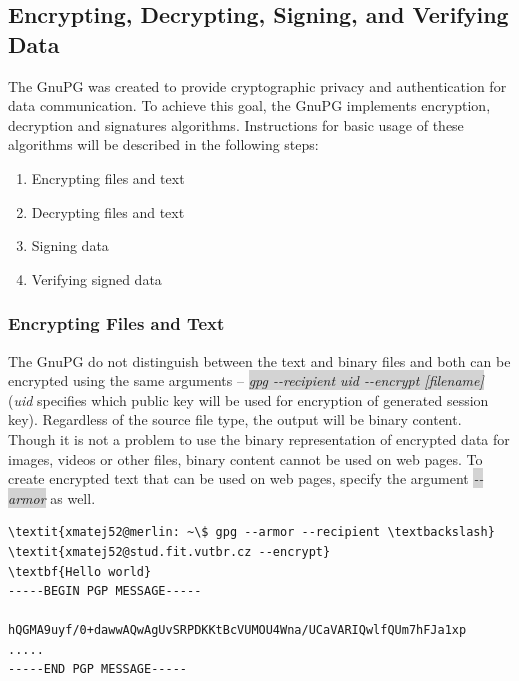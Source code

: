\subsection{Encrypting, Decrypting, Signing, and Verifying Data}
The GnuPG was created to provide cryptographic privacy and authentication for data communication. To achieve this goal, the GnuPG implements encryption, decryption and signatures algorithms. Instructions for basic usage of these algorithms will be described in the following steps:
\begin{enumerate}
    \item Encrypting files and text
    \item Decrypting files and text
    \item Signing data
    \item Verifying signed data
\end{enumerate}

\subsubsection*{Encrypting Files and Text}
The GnuPG do not distinguish between the text and binary files and both can be encrypted using the same arguments -- \colorbox{lightgray}{\textit{gpg -{}-recipient uid -{}-encrypt [filename]}} (\textit{uid} specifies which public key will be used for encryption of generated session key). Regardless of the source file type, the output will be binary content. Though it is not a problem to use the binary representation of encrypted data for images, videos or other files, binary content cannot be used on web pages. To create encrypted text that can be used on web pages, specify the argument \colorbox{lightgray}{\textit{-{}-armor}} as well.
\begin{Verbatim}[commandchars=\\\{\},codes={\catcode`$=3\catcode`_=8},samepage=false,frame=single]
\textit{xmatej52@merlin: ~\$ gpg --armor --recipient \textbackslash}
\textit{xmatej52@stud.fit.vutbr.cz --encrypt}
\textbf{Hello world}
-----BEGIN PGP MESSAGE-----

hQGMA9uyf/0+dawwAQwAgUvSRPDKKtBcVUMOU4Wna/UCaVARIQwlfQUm7hFJa1xp
.....
-----END PGP MESSAGE-----
\end{Verbatim}

